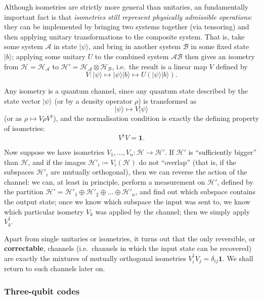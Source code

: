 \documentclass[fleqn]{article}
\begin{document}
Although isometries are strictly more general than unitaries, an fundamentally important fact is that \emph{isometries still represent physically admissible operations}: they can be implemented by bringing two systems together (via tensoring) and then applying unitary transformations to the composite system.
That is, take some system \(\mathcal{A}\) in state \(|\psi\rangle\), and bring in another system \(\mathcal{B}\) in some fixed state \(|b\rangle\);
applying some unitary \(U\) to the combined system \(\mathcal{A}\mathcal{B}\) then gives an isometry from \(\mathcal{H}=\mathcal{H}_\mathcal{A}\) to \(\mathcal{H}'=\mathcal{H}_\mathcal{A}\otimes\mathcal{H}_\mathcal{B}\), i.e.~the result is a linear map \(V\) defined by
\[
  V\colon
  |\psi\rangle
  \longmapsto
  |\psi\rangle|b\rangle
  \longmapsto
  U(|\psi\rangle|b\rangle).
\]

Any isometry is a quantum channel, since any quantum state described by the state vector \(|\psi\rangle\) (or by a density operator \(\rho\)) is transformed as
\[
  |\psi\rangle\longmapsto V|\psi\rangle
\]
(or as \(\rho\mapsto V\rho V^\dagger\)), and the normalisation condition is exactly the defining property of isometries:
\[
  V^\dagger V =\mathbf{1}.
\]

Now suppose we have isometries \(V_1,\ldots,V_n\colon\mathcal{H}\to\mathcal{H}'\).
If \(\mathcal{H}'\) is ``sufficiently bigger'' than \(\mathcal{H}\), and if the images \(\mathcal{H}'_i\coloneqq V_i(\mathcal{H})\) do not ``overlap'' (that is, if the subspaces \(\mathcal{H}'_i\) are mutually orthogonal), then we can reverse the action of the channel:
we can, at least in principle, perform a measurement on \(\mathcal{H}'\), defined by the partition \(\mathcal{H}'=\mathcal{H}'_1\oplus\mathcal{H}'_2\oplus\ldots\oplus\mathcal{H}'_n\), and find out which subspace contains the output state;
once we know which subspace the input was sent to, we know which particular isometry \(V_k\) was applied by the channel;
then we simply apply \(V^\dagger_k\).

Apart from single unitaries or isometries, it turns out that the only reversible, or \textbf{correctable}, channels (i.e.~channels in which the input state can be recovered) are exactly the mixtures of mutually orthogonal isometries \(V^\dagger_i V_j=\delta_{ij}\mathbf{1}\).
We shall return to such channels later on.

\hypertarget{three-qubit-codes}{%
\subsubsection{Three-qubit codes}\label{three-qubit-codes}}
\end{document}
